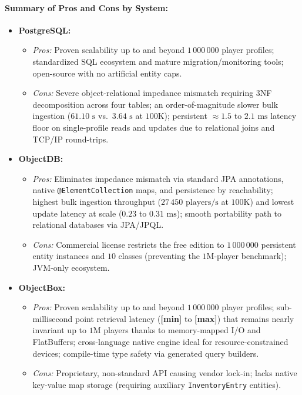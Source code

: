 \documentclass{article}
\begin{document}
\paragraph{Summary of Pros and Cons by System:}
\begin{itemize}
    \item \textbf{PostgreSQL:}
        \begin{itemize}
            \item \emph{Pros:} Proven scalability up to and beyond $1\,000\,000$ player profiles; standardized SQL ecosystem and mature migration/monitoring tools; open-source with no artificial entity caps.
            \item \emph{Cons:} Severe object-relational impedance mismatch requiring 3NF decomposition across four tables; an order-of-magnitude slower bulk ingestion ($61.10\text{ s}$ vs.\ $3.64\text{ s}$ at $100\text{K}$); persistent $\approx 1.5$ to $2.1\text{ ms}$ latency floor on single-profile reads and updates due to relational joins and TCP/IP round-trips.
        \end{itemize}

    \item \textbf{ObjectDB:}
        \begin{itemize}
            \item \emph{Pros:} Eliminates impedance mismatch via standard JPA annotations, native \texttt{@ElementCollection} maps, and persistence by reachability; highest bulk ingestion throughput ($27\,450\text{ players/s}$ at $100\text{K}$) and lowest update latency at scale ($0.23$ to $0.31\text{ ms}$); smooth portability path to relational databases via JPA/JPQL.
            \item \emph{Cons:} Commercial license restricts the free edition to $1\,000\,000$ persistent entity instances and $10$ classes (preventing the $1\text{M}$-player benchmark); JVM-only ecosystem.
        \end{itemize}

    \item \textbf{ObjectBox:}
        \begin{itemize}
            \item \emph{Pros:} Proven scalability up to and beyond $1\,000\,000$ player profiles; sub-millisecond point retrieval latency (\textbf{[min]} to \textbf{[max]}) that remains nearly invariant up to $1\text{M}$ players thanks to memory-mapped I/O and FlatBuffers; cross-language native engine ideal for resource-constrained devices; compile-time type safety via generated query builders.
            \item \emph{Cons:} Proprietary, non-standard API causing vendor lock-in; lacks native key-value map storage (requiring auxiliary \texttt{InventoryEntry} entities).
        \end{itemize}
\end{itemize}
\end{document}
